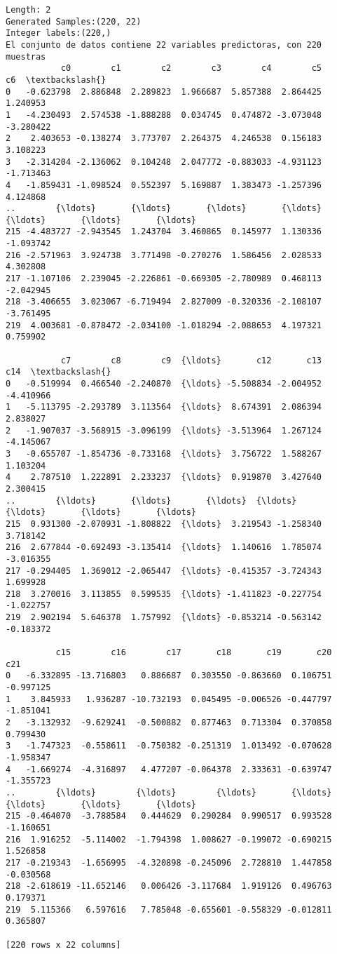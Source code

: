 \documentclass[11pt]{article}
\begin{document}
    \begin{Verbatim}[commandchars=\\\{\}]
Length: 2
Generated Samples:(220, 22)
Integer labels:(220,)
El conjunto de datos contiene 22 variables predictoras, con 220 muestras
           c0        c1        c2        c3        c4        c5        c6  \textbackslash{}
0   -0.623798  2.886848  2.289823  1.966687  5.857388  2.864425  1.240953
1   -4.230493  2.574538 -1.888288  0.034745  0.474872 -3.073048 -3.280422
2    2.403653 -0.138274  3.773707  2.264375  4.246538  0.156183  3.108223
3   -2.314204 -2.136062  0.104248  2.047772 -0.883033 -4.931123 -1.713463
4   -1.859431 -1.098524  0.552397  5.169887  1.383473 -1.257396  4.124868
..        {\ldots}       {\ldots}       {\ldots}       {\ldots}       {\ldots}       {\ldots}       {\ldots}
215 -4.483727 -2.943545  1.243704  3.460865  0.145977  1.130336 -1.093742
216 -2.571963  3.924738  3.771498 -0.270276  1.586456  2.028533  4.302808
217 -1.107106  2.239045 -2.226861 -0.669305 -2.780989  0.468113 -2.042945
218 -3.406655  3.023067 -6.719494  2.827009 -0.320336 -2.108107 -3.761495
219  4.003681 -0.878472 -2.034100 -1.018294 -2.088653  4.197321  0.759902

           c7        c8        c9  {\ldots}       c12       c13       c14  \textbackslash{}
0   -0.519994  0.466540 -2.240870  {\ldots} -5.508834 -2.004952 -4.410966
1   -5.113795 -2.293789  3.113564  {\ldots}  8.674391  2.086394  2.838027
2   -1.907037 -3.568915 -3.096199  {\ldots} -3.513964  1.267124 -4.145067
3   -0.655707 -1.854736 -0.733168  {\ldots}  3.756722  1.588267  1.103204
4    2.787510  1.222891  2.233237  {\ldots}  0.919870  3.427640  2.300415
..        {\ldots}       {\ldots}       {\ldots}  {\ldots}       {\ldots}       {\ldots}       {\ldots}
215  0.931300 -2.070931 -1.808822  {\ldots}  3.219543 -1.258340  3.718142
216  2.677844 -0.692493 -3.135414  {\ldots}  1.140616  1.785074 -3.016355
217 -0.294405  1.369012 -2.065447  {\ldots} -0.415357 -3.724343  1.699928
218  3.270016  3.113855  0.599535  {\ldots} -1.411823 -0.227754 -1.022757
219  2.902194  5.646378  1.757992  {\ldots} -0.853214 -0.563142 -0.183372

          c15        c16        c17       c18       c19       c20       c21
0   -6.332895 -13.716803   0.886687  0.303550 -0.863660  0.106751 -0.997125
1    3.845933   1.936287 -10.732193  0.045495 -0.006526 -0.447797 -1.851041
2   -3.132932  -9.629241  -0.500882  0.877463  0.713304  0.370858  0.799430
3   -1.747323  -0.558611  -0.750382 -0.251319  1.013492 -0.070628 -1.958347
4   -1.669274  -4.316897   4.477207 -0.064378  2.333631 -0.639747 -1.355723
..        {\ldots}        {\ldots}        {\ldots}       {\ldots}       {\ldots}       {\ldots}       {\ldots}
215 -0.464070  -3.788584   0.444629  0.290284  0.990517  0.993528 -1.160651
216  1.916252  -5.114002  -1.794398  1.008627 -0.199072 -0.690215  1.526858
217 -0.219343  -1.656995  -4.320898 -0.245096  2.728810  1.447858 -0.030568
218 -2.618619 -11.652146   0.006426 -3.117684  1.919126  0.496763  0.179371
219  5.115366   6.597616   7.785048 -0.655601 -0.558329 -0.012811  0.365807

[220 rows x 22 columns]
    \end{Verbatim}
\end{document}
